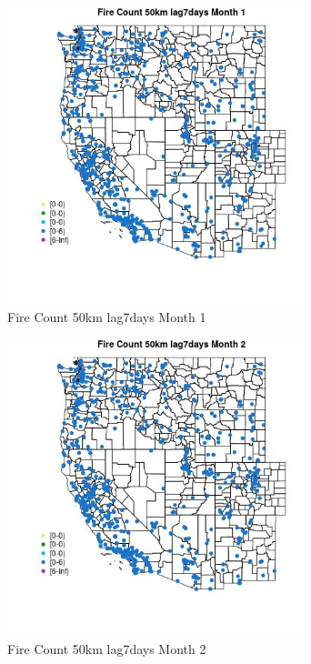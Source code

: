 \begin{figure} 
\centering  
\includegraphics[width=0.77\textwidth]{Code_Outputs/Report_ML_input_PM25_Step4_part_e_de_duplicated_aves_compiled_2019-05-21wNAs_MapObsMo1Fire_Count_50km_lag7days.jpg} 
\caption{\label{fig:Report_ML_input_PM25_Step4_part_e_de_duplicated_aves_compiled_2019-05-21wNAsMapObsMo1Fire_Count_50km_lag7days}Fire Count 50km lag7days Month 1} 
\end{figure} 
 

\begin{figure} 
\centering  
\includegraphics[width=0.77\textwidth]{Code_Outputs/Report_ML_input_PM25_Step4_part_e_de_duplicated_aves_compiled_2019-05-21wNAs_MapObsMo2Fire_Count_50km_lag7days.jpg} 
\caption{\label{fig:Report_ML_input_PM25_Step4_part_e_de_duplicated_aves_compiled_2019-05-21wNAsMapObsMo2Fire_Count_50km_lag7days}Fire Count 50km lag7days Month 2} 
\end{figure} 
 

